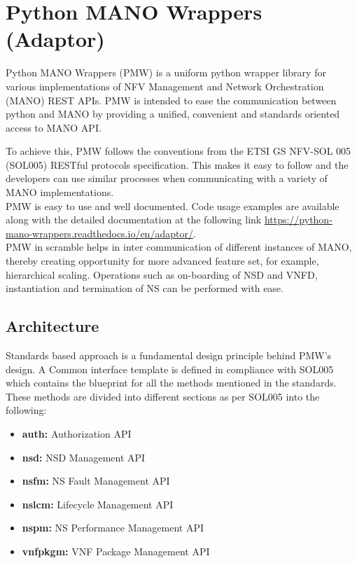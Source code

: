 \chapter{Python MANO Wrappers (Adaptor)}
\label{ch:PMW}

Python MANO Wrappers (PMW) is a uniform python wrapper library for various implementations of NFV Management and Network Orchestration (MANO) REST APIs. PMW is intended to ease the communication between python and MANO by providing a unified, convenient and standards oriented access to MANO API.

To achieve this, PMW follows the conventions from the ETSI GS NFV-SOL 005 (SOL005) RESTful protocols specification. This makes it easy to follow and the developers can use similar processes when communicating with a variety of MANO implementations.\\

PMW is easy to use and well documented. Code usage examples are available along with the detailed documentation at the following link \url{https://python-mano-wrappers.readthedocs.io/en/adaptor/}. \\

PMW in scramble helps in inter communication of different instances of MANO, thereby creating opportunity for more advanced feature set, for example, hierarchical scaling. Operations such as on-boarding of NSD and VNFD, instantiation and termination of NS can be performed with ease.


\section{Architecture}

Standards based approach is a fundamental design principle behind PMW's design. A Common interface template is defined in compliance with SOL005 which contains the blueprint for all the methods mentioned in the standards. These methods are divided into different sections as per SOL005 into the following:

\begin{itemize}
	\item \textbf{auth: }Authorization API
	\item \textbf{nsd: }NSD Management API
	\item \textbf{nsfm: }NS Fault Management API
	\item \textbf{nslcm: }Lifecycle Management API
	\item \textbf{nspm: }NS Performance Management API
	\item \textbf{vnfpkgm: }VNF Package Management API
\end{itemize} 

